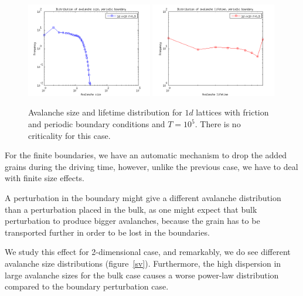 \begin{figure} 
\begin{center}
\includegraphics[width=0.49\textwidth]{results/1sp.png}
\includegraphics[width=0.49\textwidth]{results/1tp.png} 
\caption{Avalanche size and lifetime distribution for $1d$ lattices with friction and periodic boundary conditions and $T=10^5$. There is no criticality for this case. }
\label{1p}
\end{center}
\end{figure} 









For the finite boundaries, we have an automatic mechanism to drop the added grains during the driving time, however, unlike the previous case, we have to deal with finite size effects. 

A perturbation in the boundary might give a different avalanche distribution than a perturbation placed in the bulk,
as one might expect that bulk perturbation to produce bigger avalanches, 
because the grain has to be transported further in order to be lost in the boundaries.

We study this effect for 2-dimensional case, and remarkably, we do see different avalanche size distributions (figure~\ref{sv}). 
Furthermore, the high dispersion in large avalanche sizes for the bulk case causes a worse power-law distribution compared to the boundary perturbation case.

